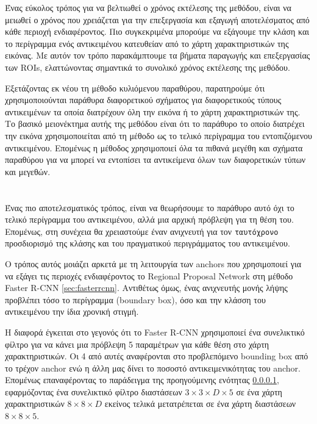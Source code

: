 Ένας εύκολος τρόπος για να βελτιωθεί ο χρόνος εκτέλεσης της μεθόδου, είναι να
μειωθεί ο χρόνος που χρειάζεται για την επεξεργασία και εξαγωγή αποτελέσματος από
κάθε περιοχή ενδιαφέροντος. Πιο συγκεκριμένα μπορούμε να εξάγουμε την κλάση και το
περίγραμμα ενός αντικειμένου κατευθείαν από το χάρτη χαρακτηριστικών της εικόνας.
Με αυτόν τον τρόπο παρακάμπτουμε τα βήματα παραγωγής και επεξεργασίας των ROIs,
ελαττώνοντας σημαντικά το συνολικό χρόνος εκτέλεσης της μεθόδου.

\begin{listing}
\end{listing}

Εξετάζοντας εκ νέου τη μέθοδο κυλιόμενου παραθύρου, παρατηρούμε ότι χρησιμοποιούνται
παράθυρα διαφορετικού σχήματος για διαφορετικούς τύπους αντικειμένων τα οποία
διατρέχουν όλη την εικόνα ή το χάρτη χαρακτηριστικών της. Το βασικό μειονέκτημα
αυτής της μεθόδου είναι ότι το παράθυρο το οποίο διατρέχει την εικόνα χρησιμοποιείται
από τη μέθοδο ως το τελικό περίγραμμα του εντοπιζόμενου αντικειμένου. Επομένως
η μέθοδος χρησιμοποιεί όλα τα πιθανά μεγέθη και σχήματα παραθύρου για να μπορεί
να εντοπίσει τα αντικείμενα όλων των διαφορετικών τύπων και μεγεθών.
\paragraph{} \hspace{0em} \\
Ένας πιο αποτελεσματικός τρόπος, είναι να θεωρήσουμε το παράθυρο αυτό
όχι το τελικό περίγραμμα του αντικειμένου, αλλά μια αρχική πρόβλεψη για τη θέση του.
Επομένως, στη συνέχεια θα χρειαστούμε έναν ανιχνευτή για τον \texttt{ταυτόχρονο}
προσδιορισμό της κλάσης και του πραγματικού περιγράμματος του αντικειμένου.

Ο τρόπος αυτός μοιάζει αρκετά με τη λειτουργία των anchors που χρησιμοποιεί για να
εξάγει τις περιοχές ενδιαφέροντος το Regional Proposal Network στη μέθοδο Faster R-CNN
\ref{sec:fasterrcnn}. Αντιθέτως όμως, ένας ανιχνευτής μονής λήψης προβλέπει τόσο
το περίγραμμα (boundary box), όσο και την κλάσση του αντικειμένου την ίδια χρονική
στιγμή.

Η διαφορά έγκειται στο γεγονός ότι το Faster R-CNN χρησιμοποιεί ένα συνελικτικό
φίλτρο για να κάνει μια πρόβλεψη 5 παραμέτρων για κάθε θέση στο χάρτη χαρακτηριστικών.
Οι 4 από αυτές αναφέρονται στο προβλεπόμενο bounding box από το τρέχον anchor ενώ η
άλλη μας δίνει το ποσοστό αντικειμενικότητας του anchor. Επομένως επαναφέροντας το
παράδειγμα της προηγούμενης ενότητας \ref{}, εφαρμόζοντας ένα συνελικτικό φίλτρο
διαστάσεων $3 \times 3 \times D \times 5$ σε ένα χάρτη χαρακτηριστικών
$8 \times 8 \times D$ εκείνος τελικά μετατρέπεται σε ένα χάρτη διαστάσεων $8 \times 8 \times 5$.

